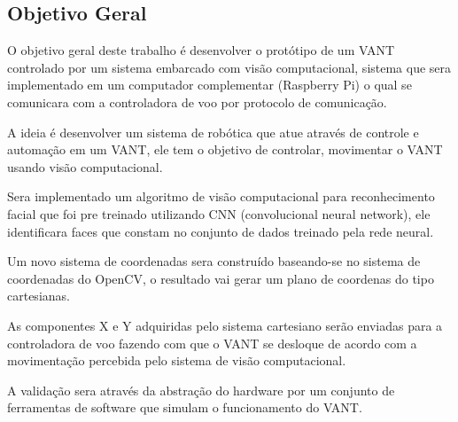  
\subsection{Objetivo Geral}
O objetivo geral deste trabalho é desenvolver o protótipo de um VANT controlado por um sistema embarcado com visão computacional, sistema que sera implementado em um computador complementar (Raspberry Pi) o qual se comunicara com a controladora de voo por protocolo de comunicação.

A ideia é desenvolver um sistema de robótica que atue através de controle e automação em um VANT, ele tem o objetivo de controlar, movimentar o VANT usando visão computacional.   

Sera implementado um algoritmo de visão computacional para reconhecimento facial que foi pre treinado utilizando CNN (convolucional neural network), ele identificara faces que constam no conjunto de dados treinado pela rede neural.

Um novo sistema de coordenadas sera construído baseando-se no sistema de coordenadas do OpenCV, o resultado vai gerar um plano de coordenas do tipo cartesianas.

As componentes X e Y adquiridas pelo sistema cartesiano serão enviadas para a controladora de voo fazendo com que o VANT se desloque de acordo com a movimentação percebida pelo sistema de visão computacional.  

A validação sera através da abstração do hardware por um conjunto de ferramentas de software que simulam o funcionamento do VANT.

